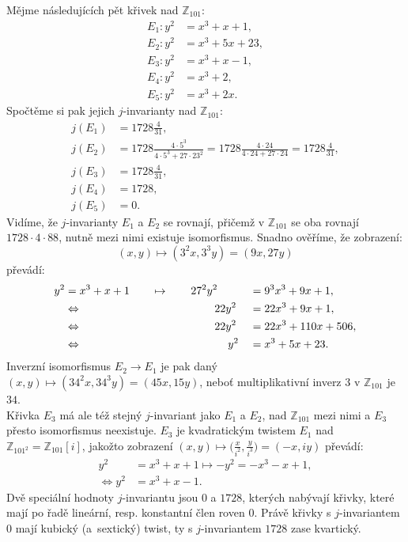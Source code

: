 \documentclass [12pt]{report}
\begin{document}
Mějme následujících pět křivek nad $\mathbb{Z}_{101}$:
\begin{align*}
E_1 : y^2 &= x^3+x+1,\\
E_2 : y^2 &= x^3+5x+23,\\
E_3 : y^2 &= x^3+x-1,\\
E_4 : y^2 &= x^3+2,\\
E_5 : y^2 &= x^3+2x.
\end{align*}
Spočtěme si pak jejich $j$-invarianty nad $\mathbb{Z}_{101}$:
\begin{align*}
j(E_1) &= 1728 \frac{4}{31},\\
j(E_2) &= 1728 \frac{4 \cdot 5^3}{4 \cdot 5^3+27 \cdot 23^2} = 1728 \frac{4 \cdot 24}{4 \cdot 24 + 27 \cdot 24} = 1728 \frac{4}{31},\\
j(E_3) &= 1728 \frac{4}{31},\\
j(E_4) &= 1728,\\
j(E_5) &= 0.
\end{align*}
Vidíme, že $j$-invarianty $E_1$ a $E_2$ se rovnají, přičemž v $\mathbb{Z}_{101}$ se oba rovnají $1728 \cdot 4 \cdot 88$, nutně mezi nimi existuje isomorfismus. Snadno ověříme, že zobrazení:
\begin{equation*}
(x,y) \mapsto (3^2 x, 3^3 y) = (9x,27y) 
\end{equation*}
převádí:
\begin{alignat*}{3}
y^2 &= x^3+x+1 \qquad \mapsto \qquad 27^2 y^2&&= 9^3 x^3 + 9x + 1,\\
&\Leftrightarrow \hspace*{4.225cm}  22y^2&&= 22 x^3 + 9x + 1,\\
&\Leftrightarrow \hspace*{4.225cm} 22y^2&&= 22 x^3 + 110x + 506,\\
&\Leftrightarrow \hspace*{4.65cm} y^2&&= x^3 + 5x + 23.
\end{alignat*}
Inverzní isomorfismus $E_2 \longrightarrow E_1$ je pak daný $(x,y) \mapsto (34^2 x, 34^3 y) = (45x,15y)$, neboť multiplikativní inverz $3$ v $\mathbb{Z}_{101}$ je $34$.\\

Křivka $E_3$ má ale též stejný $j$-invariant jako $E_1$ a $E_2$, nad $\mathbb{Z}_{101}$ mezi nimi a $E_3$ přesto isomorfismus neexistuje. $E_3$ je kvadratickým twistem $E_1$ nad $\mathbb{Z}_{101^2} = \mathbb{Z}_{101}[i]$, jakožto zobrazení $(x,y) \mapsto \Big(\frac{x}{i^2}, \frac{y}{i^3}\Big) = (-x,iy)$ převádí:
\begin{align*}
y^2 &= x^3+x+1 \mapsto -y^2 = -x^3-x+1,\\
\Leftrightarrow y^2 &=  x^3 + x - 1.
\end{align*}
Dvě speciální hodnoty $j$-invariantu jsou $0$ a $1728$, kterých nabývají křivky, které mají po řadě lineární, resp. konstantní člen roven $0$. Právě křivky s $j$-invariantem $0$ mají kubický (a~sextický) twist, ty s $j$-invariantem $1728$ zase kvartický.\\
\end{document}
